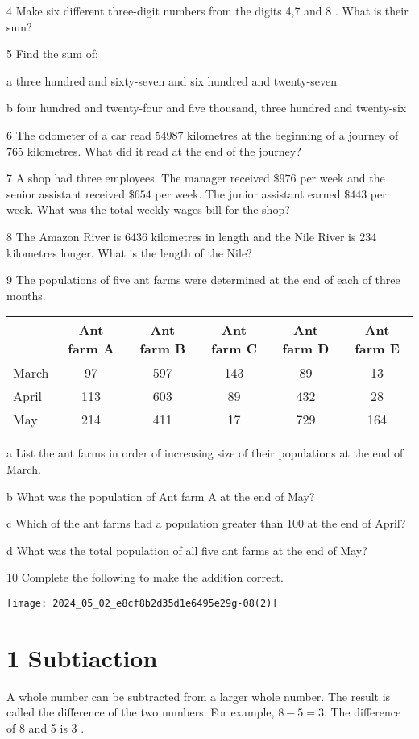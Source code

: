 \documentclass[10pt]{article}
\begin{document}
4 Make six different three-digit numbers from the digits 4,7 and 8 . What is their sum?

5 Find the sum of:

a three hundred and sixty-seven and six hundred and twenty-seven

b four hundred and twenty-four and five thousand, three hundred and twenty-six

6 The odometer of a car read 54987 kilometres at the beginning of a journey of 765 kilometres. What did it read at the end of the journey?

7 A shop had three employees. The manager received \(\$ 976\) per week and the senior assistant received \(\$ 654\) per week. The junior assistant earned \(\$ 443\) per week. What was the total weekly wages bill for the shop?

8 The Amazon River is 6436 kilometres in length and the Nile River is 234 kilometres longer. What is the length of the Nile?

9 The populations of five ant farms were determined at the end of each of three months.

\begin{center}
\begin{tabular}{|l|c|c|c|c|c|}
\hline
 & Ant farm A & Ant farm B & Ant farm C & Ant farm D & Ant farm E \\
\hline
March & 97 & 597 & 143 & 89 & 13 \\
\hline
April & 113 & 603 & 89 & 432 & 28 \\
\hline
May & 214 & 411 & 17 & 729 & 164 \\
\hline
\end{tabular}
\end{center}

a List the ant farms in order of increasing size of their populations at the end of March.

b What was the population of Ant farm A at the end of May?

c Which of the ant farms had a population greater than 100 at the end of April?

d What was the total population of all five ant farms at the end of May?

10 Complete the following to make the addition correct.

\begin{center}
\texttt{[image: 2024\_05\_02\_e8cf8b2d35d1e6495e29g-08(2)]}
\end{center}

\section*{1 Subtiaction}
A whole number can be subtracted from a larger whole number. The result is called the difference of the two numbers. For example, \(8-5=3\). The difference of 8 and 5 is 3 .
\end{document}
